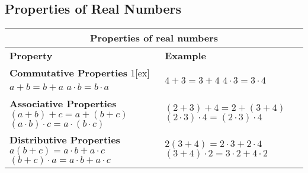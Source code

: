 \subsection{Properties of Real Numbers}

\begin{tabularx}{1\textwidth}{
    p{}
    p{}
}
\toprule
\multicolumn{2}{c}{\textbf{Properties of real numbers}} \\
\midrule

\textbf{Property} & \textbf{Example}\\
\midrule

\makecell[l]{
    \textbf{Commutative Properties} \\ 1[ex]
    $a + b = b + a$ \\ 
    $a \cdot b = b \cdot a$
} 
& 
\makecell[l]{
    $4 + 3 = 3 + 4$ \\ 
    $4 \cdot 3 = 3 \cdot 4$
} 
\\
\midrule

\makecell[l]{
    \textbf{Associative Properties} \\[1ex] 
    $(a + b) + c = a + (b + c)$ \\ 
    $(a \cdot b) \cdot c = a \cdot (b \cdot c)$
} 
&
\makecell[l]{
    $(2 + 3) + 4 = 2 + (3 + 4)$ \\ 
    $(2 \cdot 3) \cdot 4 = (2 \cdot 3) \cdot 4$
} 
\\

\midrule

\makecell[l]{
    \textbf{Distributive Properties} \\[1ex] 
    $a(b + c) = a \cdot b + a \cdot c$ \\ 
    $(b + c) \cdot a = a \cdot b + a \cdot c$
} 
& 
\makecell[l]{
    $2(3 + 4) = 2 \cdot 3 + 2 \cdot 4$ \\ 
    $(3 + 4) \cdot 2 = 3 \cdot 2 + 4 \cdot 2$
} 
\\  

\bottomrule
\end{tabularx}
